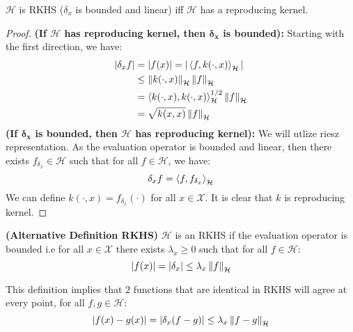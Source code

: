 \begin{theorem}
    $\mathcal{H}$ is RKHS ($\delta_x$ is bounded and linear) iff $\mathcal{H}$ has a reproducing kernel. 
\end{theorem}
\begin{proof}
    \textbf{(If $\boldsymbol{\mathcal{H}}$ has reproducing kernel, then $\boldsymbol{\delta_x}$ is bounded): }Starting with the first direction, we have:
    \begin{equation*}
    \begin{aligned}
        |\delta_xf| &= |f(x)| = |\left\langle f, k(\cdot, x) \right\rangle_\mathcal{H}| \\
        &\le \left\lVert k(\cdot, x)\right\rVert_\mathcal{H}\left\lVert f\right\rVert_\mathcal{H} \\
        &=\left\langle k(\cdot, x), k(\cdot, x) \right\rangle^{1/2}_\mathcal{H}\left\lVert f\right\rVert_\mathcal{H} \\
        &=\sqrt{k(x,x)}\left\lVert f\right\rVert_\mathcal{H}
    \end{aligned}
    \end{equation*}
    \textbf{(If $\boldsymbol{\delta_x}$ is bounded, then $\boldsymbol{\mathcal{H}}$ has reproducing kernel): } We will utlize riesz representation. As the evaluation operator is bounded and linear, then there exists $f_{\delta_x}\in\mathcal{H}$ such that for all $f\in\mathcal{H}$, we have:
    \begin{equation*}
        \delta_x f = \left\langle f, f_{\delta_x} \right\rangle_\mathcal{H}        
    \end{equation*}
    We can define $k(\cdot, x) = f_{\delta_x}(\cdot)$ for all $x\in\mathcal{X}$. It is clear that $k$ is reproducing kernel.
\end{proof}

\begin{definition}{\textbf{(Alternative Definition RKHS)}}
    $\mathcal{H}$ is an RKHS if the evaluation operator is bounded i.e for all $x\in\mathcal{X}$ there exists $\lambda_x\ge0$ such that for all $f\in\mathcal{H}$:
    \begin{equation*}
        |f(x)| = |\delta_x| \le \lambda_x\left\lVert f\right\rVert_\mathcal{H}
    \end{equation*}
\end{definition}

\begin{remark}
    This definition implies that $2$ functions that are identical in RKHS will agree at every point, for all $f, g\in\mathcal{H}$:
    \begin{equation*}
        \left| f(x)-g(x) \right| = \left| \delta_x(f-g) \right| \le \lambda_x\left\lVert f-g\right\rVert_\mathcal{H}
    \end{equation*}
\end{remark}

